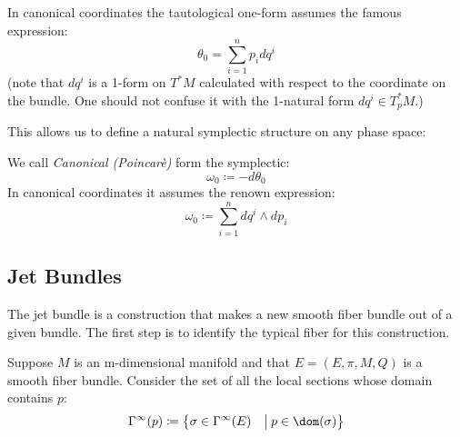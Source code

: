 \documentclass[Main]{subfiles}
\begin{document}
						In canonical coordinates the tautological one-form assumes the famous expression:
						\begin{displaymath}
							\theta_0 = \sum_{i=1}^n {p_i} d q^i
						\end{displaymath}
						(note that $d q^i$ is a 1-form on $T^*M$ calculated with respect to the coordinate on the bundle. One should not confuse it with the 1-natural form $d q^i \in T^*_p M$.)


					This allows us to define a natural symplectic structure on any phase space:
					\begin{definition}\label{Def:NatSymForm}
						We call \emph{Canonical (Poincarè)} form the symplectic:
						\begin{displaymath}
							\omega_0 \coloneqq -d \theta_0
						\end{displaymath}
						In canonical coordinates it assumes the renown expression:
						\begin{displaymath}
							\omega_0 \coloneqq \sum_{i=1}^n  d q^i \wedge d p_i
						\end{displaymath}
					\end{definition}

		\subsection{Jet Bundles}\label{Sect:JetBundles}
			The jet bundle is a %
			construction that makes a new smooth fiber bundle out of a given bundle. The first step is to identify the typical fiber for this construction.

			Suppose $M$ is an m-dimensional manifold and that $E =(E,\pi,M,Q)$ is a smooth fiber bundle.
			Consider the set of all the local sections whose domain contains $p$:
			\begin{displaymath}
				\Gamma^\infty (p) \coloneqq \big\{ \sigma \in \Gamma^\infty(E) \quad \big\vert\:  p \in \dom(\sigma)  \big\}
			\end{displaymath}
\end{document}
